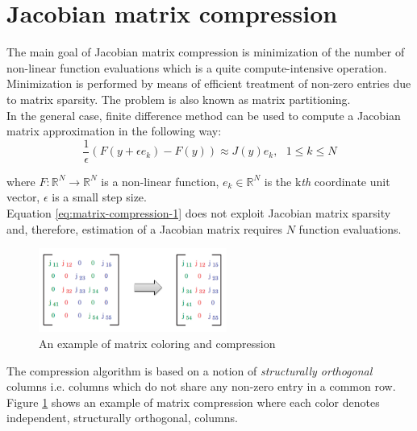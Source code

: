 \section{Jacobian matrix compression}
\label{sec:jacobian-matrix-compression}


The main goal of Jacobian matrix compression is minimization of the number of non-linear function evaluations which is a quite compute-intensive operation. Minimization is performed by means of efficient treatment of non-zero entries due to matrix sparsity. The problem is also known as matrix partitioning.\\


In the general case, finite difference method can be used to compute a Jacobian matrix approximation in the following way:\\

\begin{equation} \label{eq:matrix-compression-1}
	\frac{1}{\epsilon} (F(y + \epsilon e_{k}) - F(y)) \approx J(y) e_{k}, \: \: \: 1 \leq k \leq N
\end{equation}

where $F : \mathbb{R}^{N} \rightarrow \mathbb{R}^{N}$  is a non-linear function, $e_{k} \in \mathbb{R}^{N}$ is the k\textit{th} coordinate unit vector, $\epsilon$ is a small step size.\\


Equation \ref{eq:matrix-compression-1} does not exploit Jacobian matrix sparsity and, therefore, estimation of a Jacobian matrix requires $N$  function evaluations.\\


\figpointer{\ref{fig:example-of-matrix-compression}}
\begin{figure}[htpb]
  \centering
  \includegraphics[width=0.55\textwidth]{figures/chapter-3/matrix-compression-example.png}
\caption{An example of matrix coloring and compression \cite{gebremedhin2005color}}
\label{fig:example-of-matrix-compression}
\end{figure}


The compression algorithm is based on a notion of \textit{structurally orthogonal} columns i.e. columns which do not share any non-zero entry in a common row. Figure \ref{fig:example-of-matrix-compression} shows an example of matrix compression where each color denotes independent, structurally orthogonal, columns.\\


